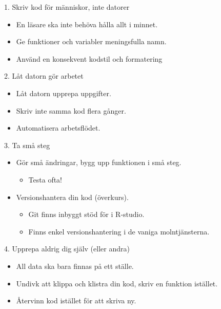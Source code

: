 \documentclass[
  11pt,
  ignorenonframetext,
]{beamer}
\providecommand{\tightlist}{%
  \setlength{\itemsep}{0pt}\setlength{\parskip}{0pt}}
\begin{document}
\begin{frame}{1. Skriv kod för människor, inte datorer}
\protect\hypertarget{skriv-kod-fuxf6r-muxe4nniskor-inte-datorer}{}
\begin{itemize}
\tightlist
\item
  En läsare ska inte behöva hålla allt i minnet.
\item
  Ge funktioner och variabler meningsfulla namn.
\item
  Använd en konsekvent kodstil och formatering
\end{itemize}
\end{frame}

\begin{frame}{2. Låt datorn gör arbetet}
\protect\hypertarget{luxe5t-datorn-guxf6r-arbetet}{}
\begin{itemize}
\tightlist
\item
  Låt datorn upprepa uppgifter.
\item
  Skriv inte samma kod flera gånger.
\item
  Automatisera arbetsflödet.
\end{itemize}
\end{frame}

\begin{frame}{3. Ta små steg}
\protect\hypertarget{ta-smuxe5-steg}{}
\begin{itemize}
\tightlist
\item
  Gör små ändringar, bygg upp funktionen i små steg.

  \begin{itemize}
  \tightlist
  \item
    Testa ofta!
  \end{itemize}
\item
  Versionshantera din kod (överkurs).

  \begin{itemize}
  \tightlist
  \item
    Git finns inbyggt stöd för i R-studio.
  \item
    Finns enkel versionshantering i de vaniga molntjänsterna.
  \end{itemize}
\end{itemize}
\end{frame}

\begin{frame}{4. Upprepa aldrig dig själv (eller andra)}
\protect\hypertarget{upprepa-aldrig-dig-sjuxe4lv-eller-andra}{}
\begin{itemize}
\tightlist
\item
  All data ska bara finnas på ett ställe.
\item
  Undivk att klippa och klistra din kod, skriv en funktion istället.
\item
  Återvinn kod istället för att skriva ny.
\end{itemize}
\end{frame}
\end{document}
